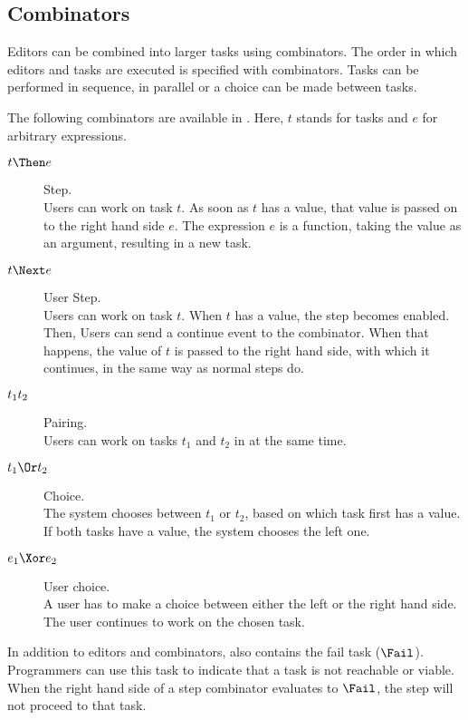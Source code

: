 \subsection{Combinators}

Editors can be combined into larger tasks using combinators.
The order in which editors and tasks are executed is specified with combinators. Tasks can be performed in sequence, in parallel or a choice can be made between tasks.


The following combinators are available in \TOPHAT.
Here, $t$ stands for tasks and $e$ for arbitrary expressions.
\begin{description}
  \item[$t \Then e$] Step.\\
    Users can work on task $t$.
    As soon as $t$ has a value, that value is passed on to the right hand side $e$.
    The expression $e$ is a function, taking the value as an argument, resulting in a new task.
  \item[$t \Next e$] User Step.\\
    Users can work on task $t$.
    When $t$ has a value, the step becomes enabled.
    Then, Users can send a continue event to the combinator.
    When that happens, the value of $t$ is passed to the right hand side, with which it continues,
    in the same way as normal steps do.
  \item[$t_1 \relax t_2$] Pairing.\\
    Users can work on tasks $t_1$ and $t_2$ in at the same time.
  \item[$t_1 \Or t_2$] Choice.\\
    The system chooses between $t_1$ or $t_2$,
    based on which task first has a value.
    If both tasks have a value, the system chooses the left one.
  \item[$e_1 \Xor e_2$] User choice.\\
    A user has to make a choice between either the left or the right hand side.
    The user continues to work on the chosen task.
\end{description}

In addition to editors and combinators, \TOPHAT also contains the fail task ($\Fail$).
Programmers can use this task to indicate that a task is not reachable or viable.
When the right hand side of a step combinator evaluates to $\Fail$, the step will not proceed to that task.

